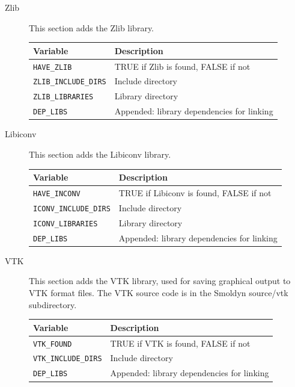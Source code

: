 \documentclass {scrbook}
\newcommand {\ttt} {\texttt}
\begin{document}
\begin{description}
\item[Zlib]
This section adds the Zlib library.
\begin{longtable}[c]{ll}
Variable & Description\\
\hline
\ttt{HAVE\_ZLIB} & TRUE if Zlib is found, FALSE if not\\
\ttt{ZLIB\_INCLUDE\_DIRS} & Include directory\\
\ttt{ZLIB\_LIBRARIES} & Library directory\\
\ttt{DEP\_LIBS} & Appended: library dependencies for linking\\
\end{longtable}

\item[Libiconv]
This section adds the Libiconv library.
\begin{longtable}[c]{ll}
Variable & Description\\
\hline
\ttt{HAVE\_INCONV} & TRUE if Libiconv is found, FALSE if not\\
\ttt{ICONV\_INCLUDE\_DIRS} & Include directory\\
\ttt{ICONV\_LIBRARIES} & Library directory\\
\ttt{DEP\_LIBS} & Appended: library dependencies for linking\\
\end{longtable}

\item[VTK]
This section adds the VTK library, used for saving graphical output to VTK format files. The VTK source code is in the Smoldyn source/vtk subdirectory.
\begin{longtable}[c]{ll}
Variable & Description\\
\hline
\ttt{VTK\_FOUND} & TRUE if VTK is found, FALSE if not\\
\ttt{VTK\_INCLUDE\_DIRS} & Include directory\\
\ttt{DEP\_LIBS} & Appended: library dependencies for linking\\
\end{longtable}


\end{description}
\end{document}

